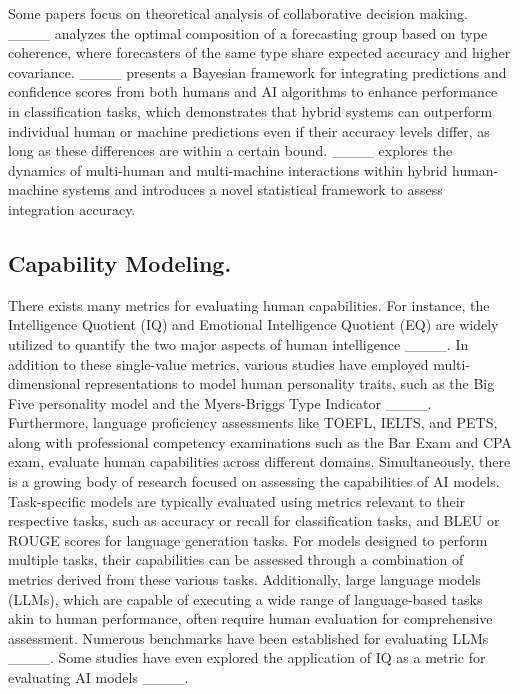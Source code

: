 Some papers focus on theoretical analysis of collaborative decision making. ____ analyzes the optimal composition of a forecasting group based on type coherence, where forecasters of the same type share expected accuracy and higher covariance. ____ presents a Bayesian framework for integrating predictions and confidence scores from both humans and AI algorithms to enhance performance in classification tasks, which demonstrates that hybrid systems can outperform individual human or machine predictions even if their accuracy levels differ, as long as these differences are within a certain bound. ____ explores the dynamics of multi-human and multi-machine interactions within hybrid human-machine systems and introduces a novel statistical framework to assess integration accuracy. 

\subsection{Capability Modeling.}

There exists many metrics for evaluating human capabilities. 
For instance, the Intelligence Quotient (IQ) and Emotional Intelligence Quotient (EQ) are widely utilized to quantify the two major aspects of human intelligence ____. In addition to these single-value metrics, various studies have employed multi-dimensional representations to model human personality traits, such as the Big Five personality model and the Myers-Briggs Type Indicator ____. 
Furthermore, language proficiency assessments like TOEFL, IELTS, and PETS, along with professional competency examinations such as the Bar Exam and CPA exam, evaluate human capabilities across different domains. Simultaneously, there is a growing body of research focused on assessing the capabilities of AI models. Task-specific models are typically evaluated using metrics relevant to their respective tasks, such as accuracy or recall for classification tasks, and BLEU or ROUGE scores for language generation tasks. For models designed to perform multiple tasks, their capabilities can be assessed through a combination of metrics derived from these various tasks.
Additionally, large language models (LLMs), which are capable of executing a wide range of language-based tasks akin to human performance, often require human evaluation for comprehensive assessment. Numerous benchmarks have been established for evaluating LLMs ____. Some studies have even explored the application of IQ as a metric for evaluating AI models ____. 

